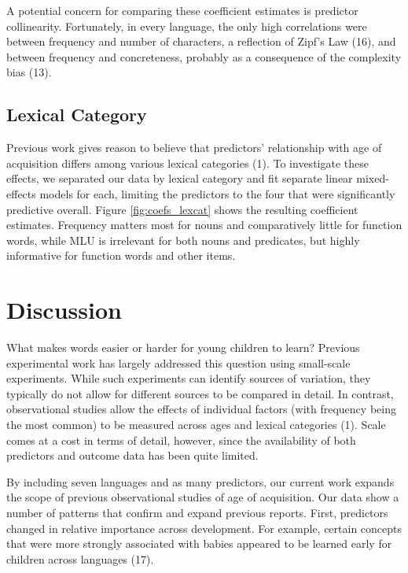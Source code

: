\documentclass[9pt,twocolumn,twoside]{pnas-new}
\begin{document}
A potential concern for comparing these coefficient estimates is
predictor collinearity. Fortunately, in every language, the only high
correlations were between frequency and number of characters, a
reflection of Zipf's Law (16), and between frequency and concreteness,
probably as a consequence of the complexity bias (13).

\subsection{Lexical Category}\label{lexical-category}

Previous work gives reason to believe that predictors' relationship with
age of acquisition differs among various lexical categories (1). To
investigate these effects, we separated our data by lexical category and
fit separate linear mixed-effects models for each, limiting the
predictors to the four that were significantly predictive overall.
Figure \ref{fig:coefs_lexcat} shows the resulting coefficient estimates.
Frequency matters most for nouns and comparatively little for function
words, while MLU is irrelevant for both nouns and predicates, but highly
informative for function words and other items.

\section*{Discussion}\label{discussion}

What makes words easier or harder for young children to learn? Previous
experimental work has largely addressed this question using small-scale
experiments. While such experiments can identify sources of variation,
they typically do not allow for different sources to be compared in
detail. In contrast, observational studies allow the effects of
individual factors (with frequency being the most common) to be measured
across ages and lexical categories (1). Scale comes at a cost in terms
of detail, however, since the availability of both predictors and
outcome data has been quite limited.

By including seven languages and as many predictors, our current work
expands the scope of previous observational studies of age of
acquisition. Our data show a number of patterns that confirm and expand
previous reports. First, predictors changed in relative importance
across development. For example, certain concepts that were more
strongly associated with babies appeared to be learned early for
children across languages (17).
\end{document}
